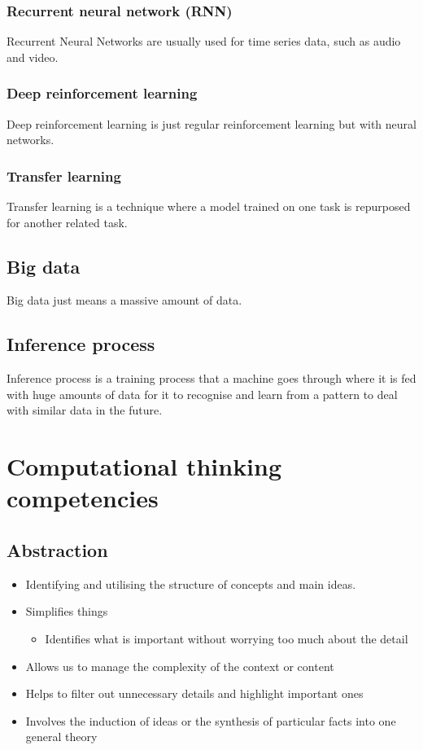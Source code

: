 \documentclass[11pt]{article}
\begin{document}
\subsubsection{Recurrent neural network (RNN)}
\label{sec:orgcee1536}
Recurrent Neural Networks are usually used for time series data, such as audio and video.
\subsubsection{Deep reinforcement learning}
\label{sec:org0864a49}
Deep reinforcement learning is just regular reinforcement learning but with neural networks.
\subsubsection{Transfer learning}
\label{sec:orgb1f78d3}
Transfer learning is a technique where a model trained on one task is repurposed for another related task.
\subsection{Big data}
\label{sec:orge14beb3}
Big data just means a massive amount of data.
\subsection{Inference process}
\label{sec:org505f135}
Inference process is a training process that a machine goes through where it is fed with huge amounts of data for it to recognise and learn from a pattern to deal with similar data in the future.
\section{Computational thinking competencies}
\label{sec:org280b609}

\subsection{Abstraction}
\label{sec:org25e29a9}
\begin{itemize}
\item Identifying and utilising the structure of concepts and main ideas.
\item Simplifies things
\begin{itemize}
\item Identifies what is important without worrying too much about the detail
\end{itemize}
\item Allows us to manage the complexity of the context or content
\item Helps to filter out unnecessary details and highlight important ones
\item Involves the induction of ideas or the synthesis of particular facts into one general theory
\end{itemize}
\end{document}
